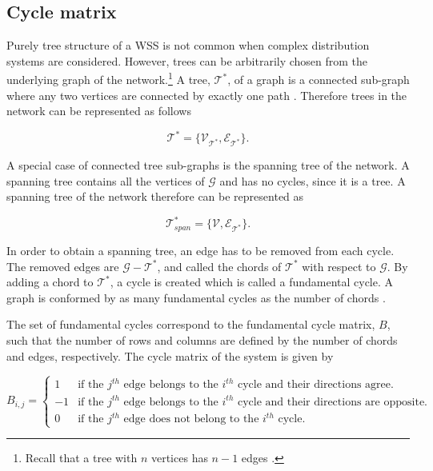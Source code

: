\subsection{Cycle matrix}
\label{cycle_matrix}

Purely tree structure of a WSS is not common when complex distribution systems are considered. However, trees can be arbitrarily chosen from the underlying graph of the network.\footnote{Recall that a tree with $n$ vertices has $n-1$ edges \cite{deo2017graph}.}  A tree, $\mathcal{T}^* $, of a graph is a connected sub-graph where any two vertices are connected by exactly one path \cite{deo2017graph}. Therefore trees in the network can be represented as follows

\begin{equation}
  \label{Numberofchords}
  \mathcal{T}^* = \{\mathcal{V_{\mathcal{T}^*}}, \mathcal{E_{\mathcal{T}^*}} \}. 
\end{equation}

A special case of connected tree sub-graphs is the spanning tree of the network. A spanning tree contains all the vertices of $\mathcal{G}$ and has no cycles, since it is a tree. A spanning tree of the network therefore can be represented as

\begin{equation}
  \label{Numberofchords}
  \mathcal{T}^*_{span} = \{\mathcal{V}, \mathcal{E_{\mathcal{T}^*}} \}.
\end{equation}

In order to obtain a spanning tree, an edge has to be removed from each cycle. The removed edges are $\mathcal{G} - \mathcal{T}^*$, and called the chords of $\mathcal{T}^*$ with respect to $\mathcal{G}$. By adding a chord to $\mathcal{T}^*$, a cycle is created which is called a fundamental cycle. A graph is conformed by as many fundamental cycles as the number of chords \cite{deo2017graph}.

The set of fundamental cycles correspond to the fundamental cycle matrix, $B$, such that the number of rows and columns are defined by the number of chords and edges, respectively. The cycle matrix of the system is given by

\begin{equation}
\label{DiGraphCycle}
 B_{i,j} =
		\left\{
		\begin{array}{ll}
		
		1 			&     \text{if the $j^{th}$ edge belongs to the $i^{th}$ cycle and their directions agree.}	
\\
		-1          &     \text{if the $j^{th}$ edge belongs to the $i^{th}$ cycle and their directions are opposite.}
\\
        0           &     \text{if the $j^{th}$ edge does not belong to the $i^{th}$ cycle.}
		\end{array}
		\right.
\end{equation}	

